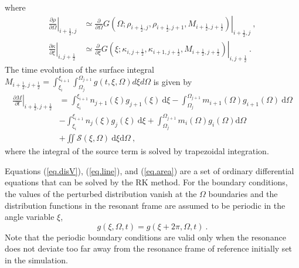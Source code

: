 where 
\begin{equation}
    \begin{aligned}
    \left.\frac{\partial \rho}{\partial \Omega}\right|_{i+\frac{1}{2},j}
    &\simeq \left.\frac{\partial}{\partial \Omega} G(\Omega;\rho_{i+\frac{1}{2},j},\rho_{i+\frac{1}{2},j+1}, M_{i+\frac{1}{2},j+\frac{1}{2}})\right|_{i+\frac{1}{2},j}~, \\
    \left.\frac{\partial \kappa}{\partial \xi}\right|_{i,j+\frac{1}{2}}
 &\simeq \left.\frac{\partial}{\partial \xi} G(\xi;\kappa_{i,j+\frac{1}{2}},\kappa_{i+1,j+\frac{1}{2}}, M_{i+\frac{1}{2},j+\frac{1}{2}})\right|_{i,j+\frac{1}{2}}~.
    \end{aligned}
\end{equation} 
The time evolution of the surface integral $M_{i+\frac{1}{2},j+\frac{1}{2}}=\int_{\xi_i}^{\xi_{i+1}}\int_{\Omega_j}^{\Omega_{j+1}}g(t,\xi,\Omega)d\xi d\Omega$
is given by \cite{imadera2009}
\begin{equation}\label{eq.area}
    \begin{aligned}
         \left.\frac{\partial M}{\partial t}\right|_{i+\frac{1}{2},j+\frac{1}{2}}
         &= \int_{\xi_i}^{\xi_{i+1}} n_{j+1}(\xi) g_{j+1}(\xi)~\mathrm{d}\xi - \int_{\Omega_j}^{\Omega_{j+1}} m_{i+1}(\Omega) g_{i+1} (\Omega)~\mathrm{d} \Omega \\
        & - \int_{\xi_i}^{\xi_{i+1}} n_{j}(\xi) g_{j}(\xi)~\mathrm{d}\xi + \int_{\Omega_j}^{\Omega_{j+1}} m_{i}(\Omega) g_{i} (\Omega) \mathrm{d}\Omega \\
        &+ \iint \mathcal{S}(\xi,\Omega)~\mathrm{d}\xi\mathrm{d}\Omega~,
    \end{aligned}
\end{equation}
where the integral of the source term is solved by trapezoidal integration.


Equations (\ref{eq.disV}), (\ref{eq.line}), and (\ref{eq.area})
are a set of ordinary differential equations that can be solved  by the RK method.
For the boundary conditions, the values of the perturbed distribution vanish at the $\Omega$ boundaries
and
the distribution functions in  the resonant frame are assumed to be periodic in the  angle variable $\xi$,
\begin{equation}
    g\left(\xi,\Omega,t\right)=g\left(\xi+2 \pi,\Omega,t\right)~.
\end{equation}
Note that the periodic boundary conditions are valid only when the resonance does not deviate too far away from the  resonance frame of reference initially set in the simulation.



